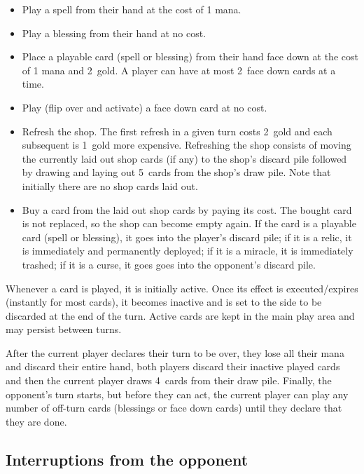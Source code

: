 \documentclass[dvipsnames,parskip,a4paper]{scrartcl}
\newcommand{\facedowncost}{2}
\newcommand{\refreshcost}{2}
\newcommand{\refreshcostincrease}{1}
\newcommand{\handsize}{4}
\newcommand{\facedownsize}{2}
\newcommand{\shopsize}{5}
\begin{document}
\begin{itemize}
\item Play a spell from their hand at the cost of 1 mana.
\item Play a blessing from their hand at no cost.
\item Place a playable card (spell or blessing) from their hand face down at the cost of 1 mana and \facedowncost \ gold. A player can have at most \facedownsize \ face down cards at a time.
\item Play (flip over and activate) a face down card at no cost.
\item Refresh the shop. The first refresh in a given turn costs \refreshcost \ gold and each subsequent is \refreshcostincrease \ gold more expensive.
Refreshing the shop consists of moving the currently laid out shop cards (if any) to the shop's discard pile followed by drawing and laying out \shopsize \ cards from the shop's draw pile. Note that initially there are no shop cards laid out.
\item Buy a card from the laid out shop cards by paying its cost.
The bought card is not replaced, so the shop can become empty again. If the card is a playable card (spell or blessing), it goes into the player's discard pile; if it is a relic, it is immediately and permanently deployed; if it is a miracle, it is immediately trashed; if it is a curse, it goes goes into the opponent's discard pile.
\end{itemize}

Whenever a card is played, it is initially active. Once its effect is executed/expires (instantly for most cards), it becomes inactive and is set to the side to be discarded at the end of the turn. Active cards are kept in the main play area and may persist between turns.

\vspace{4pt}

After the current player declares their turn to be over, they lose all their mana and discard their entire hand, both players discard their inactive played cards and then the current player draws \handsize \ cards from their draw pile. Finally, the opponent's turn starts, but before they can act, the current player can play any number of off-turn cards (blessings or face down cards) until they declare that they are done.

\subsection*{Interruptions from the opponent}
\end{document}
